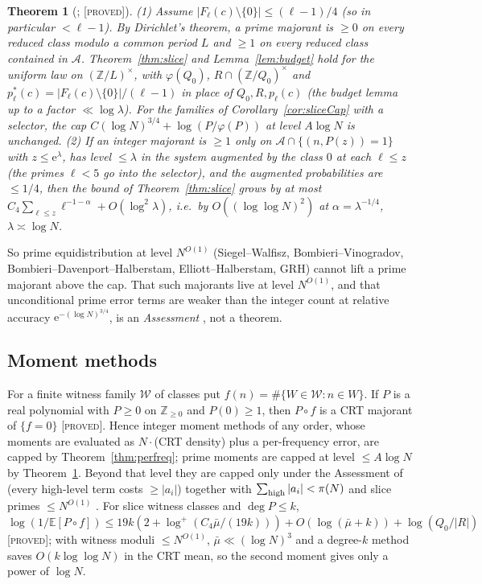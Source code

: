 \documentclass[10pt,reqno]{amsart}
\newtheorem{theorem}{Theorem}[section]
\theoremstyle{definition}
\theoremstyle{remark}
\newcommand{\A}{\mathcal A}
\newcommand{\E}{\mathbb E}
\newcommand{\Z}{\mathbb Z}
\newcommand{\e}{\mathrm e}
\newcommand{\lab}[1]{\textup{[\textsc{#1}]}}
\begin{document}
\begin{theorem}[{\cite[Lemma~3.1, Thms~3.2, 3.3]{NC}}; \lab{proved}]\label{thm:primemaj}
(1) Assume $|F_\ell(c)\setminus\{0\}|\leq(\ell-1)/4$ (so in particular
$<\ell-1$).  By Dirichlet's theorem, a prime
majorant is $\geq0$ on every reduced class modulo a common period $L$ and
$\geq1$ on every reduced class contained in $\A$.  Theorem~\ref{thm:slice}
and Lemma~\ref{lem:budget} hold for the uniform law on $(\Z/L)^\times$, with
$\varphi(Q_0)$, $R\cap(\Z/Q_0)^\times$ and $p^*_\ell(c)=|F_\ell(c)\setminus\{0\}|/(\ell-1)$
in place of $Q_0,R,p_\ell(c)$ (the budget lemma up to a factor
$\ll\log\lambda$).  For the families of Corollary~\ref{cor:sliceCap} with a
selector, the cap $C(\log N)^{3/4}+\log(P/\varphi(P))$ at level $A\log N$ is
unchanged.
(2) If an integer majorant is $\geq1$ only on $\A\cap\{(n,P(z))=1\}$ with
$z\leq\e^\lambda$, has level $\leq\lambda$ in the system augmented by the class $0$
at each $\ell\leq z$ (the primes $\ell<5$ go into the selector), and the
augmented probabilities are $\leq1/4$, then the
bound of Theorem~\ref{thm:slice} grows by at most
$C_4\sum_{\ell\leq z}\ell^{-1-\alpha}+O(\log^2\lambda)$, i.e.\ by
$O((\log\log N)^2)$ at $\alpha=\lambda^{-1/4}$, $\lambda\asymp\log N$.
\end{theorem}
So prime equidistribution at level $N^{O(1)}$ (Siegel--Walfisz,
Bombieri--Vinogradov, Bombieri--Davenport--Halberstam,
Elliott--Halberstam, GRH) cannot lift a prime majorant above the cap.
That such majorants live at level $N^{O(1)}$, and that unconditional prime
error terms are weaker than the integer count at relative accuracy
$\e^{-(\log N)^{3/4}}$, is an \emph{Assessment} \cite[Remark~3.4]{NC}, not a
theorem.

\subsection{Moment methods}
For a finite witness family $\mathcal W$ of classes put
$f(n)=\#\{W\in\mathcal W:n\in W\}$.  If $P$ is a real polynomial with $P\geq0$
on $\Z_{\geq0}$ and $P(0)\geq1$, then $P\circ f$ is a CRT majorant of
$\{f=0\}$ \cite[Prop.~4.1]{NC} \lab{proved}.  Hence integer moment methods
of any order, whose moments are evaluated as $N\cdot$(CRT density) plus a
per-frequency error, are capped by Theorem~\ref{thm:perfreq}; prime moments
are capped at level $\leq A\log N$ by Theorem~\ref{thm:primemaj}.  Beyond
that level they are capped only under the Assessment of
\cite[Remark~3.4]{NC} (every high-level term costs $\geq|a_i|$) together
with $\sum_{\rm high}|a_i|<\pi(N)$ and slice primes $\leq N^{O(1)}$
\cite[Prop.~4.1]{NC}.  For slice witness classes
and $\deg P\leq k$, $\log(1/\E[P\circ f])\leq19k(2+\log^+(C_4\bar\mu/(19k)))+O(\log(\bar\mu+k))+\log(Q_0/|R|)$
\cite[Prop.~4.2]{NC} \lab{proved}; with witness moduli $\leq N^{O(1)}$,
$\bar\mu\ll(\log N)^3$ and a degree-$k$
method saves $O(k\log\log N)$ in the CRT mean, so the second moment gives
only a power of $\log N$.
\end{document}
